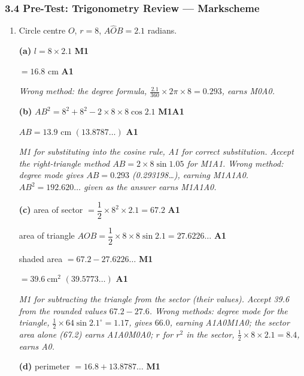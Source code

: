\documentclass[12pt, twoside]{article}
\begin{document}
\subsubsection*{3.4 Pre-Test: Trigonometry Review --- Markscheme}

\begin{enumerate}[itemsep=0.2cm]

\item[1.] [Maximum mark: 11]

Circle centre $O$, $r = 8$, $A\hat{O}B = 2.1$ radians.

\textbf{(a)} $l = 8 \times 2.1$ \hfill \textbf{M1}

$= 16.8$ cm \hfill \textbf{A1}

\emph{Wrong method: the degree formula, $\frac{2.1}{360} \times 2\pi
\times 8 = 0.293$, earns M0A0.}

\textbf{(b)} $AB^{2} = 8^{2} + 8^{2} - 2 \times 8 \times 8 \cos 2.1$
\hfill \textbf{M1A1}

$AB = 13.9$ cm \quad $(13.8787\ldots)$ \hfill \textbf{A1}

\emph{M1 for substituting into the cosine rule, A1 for correct
substitution. Accept the right-triangle method
$AB = 2 \times 8\sin 1.05$ for M1A1. Wrong method: degree mode gives
$AB = 0.293$ (0.293198\ldots), earning M1A1A0. $AB^{2} = 192.620\ldots$
given as the answer earns M1A1A0.}

\textbf{(c)} area of sector $= \dfrac{1}{2} \times 8^{2} \times 2.1
= 67.2$ \hfill \textbf{A1}

area of triangle $AOB = \dfrac{1}{2} \times 8 \times 8 \sin 2.1
= 27.6226\ldots$ \hfill \textbf{A1}

shaded area $= 67.2 - 27.6226\ldots$ \hfill \textbf{M1}

$= 39.6\ \text{cm}^{2}$ \quad $(39.5773\ldots)$ \hfill \textbf{A1}

\emph{M1 for subtracting the triangle from the sector (their values).
Accept 39.6 from the rounded values $67.2 - 27.6$. Wrong methods: degree
mode for the triangle, $\frac{1}{2} \times 64 \sin 2.1^\circ = 1.17$,
gives $66.0$, earning A1A0M1A0; the sector area alone (67.2) earns
A1A0M0A0; $r$ for $r^{2}$ in the sector, $\frac{1}{2} \times 8 \times
2.1 = 8.4$, earns A0.}

\textbf{(d)} perimeter $= 16.8 + 13.8787\ldots$ \hfill \textbf{M1}


\end{enumerate}
\end{document}

